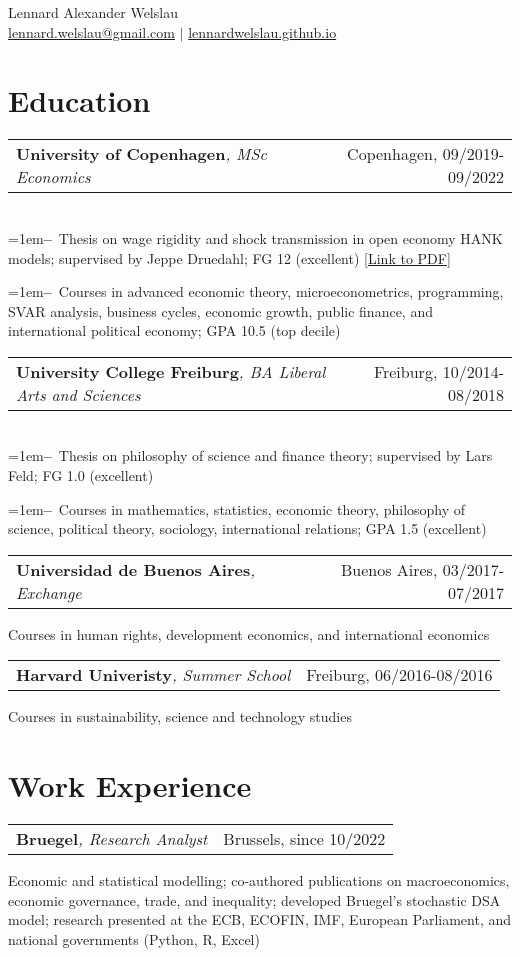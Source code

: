 \documentclass[A4,11pt]{article}
\makeatletter
\newcommand{\Subheading}[4]{   
    \begin{tabular*}{0.97\textwidth}[t]{l@{\extracolsep{\fill}}r}
      \textbf{#1}\textit{\small #2} & \footnotesize #3 
      \end{tabular*}
      \small #4 
    \vspace{7pt}}
\newcommand{\myitem}[1]{\hangindent=1em\hangafter=1\textbf{--}~#1\par}
\makeatother
\begin{document}
\begin{center}
    {\Large Lennard Alexander Welslau} \\ 
    \href{mailto:lennard.welslau@gmail.com}{lennard.welslau@gmail.com} $|$ \href{https://lennardwelslau.github.io/}{lennardwelslau.github.io}
\end{center}


\section{Education}

    \Subheading
        {University of Copenhagen}{, MSc Economics}{Copenhagen, 09/2019-09/2022}
        {\\
        \myitem{Thesis on wage rigidity and shock transmission in open economy HANK models; 
        supervised by Jeppe Druedahl; FG 12 (excellent) 
        [\href{https://lennardwelslau.github.io/research/Welslau_MA_Thesis_2022_Wage_Flexibility_Open_Economy_HANK.pdf}{Link to PDF}]}
        \myitem{Courses in advanced economic theory, microeconometrics, programming, 
        SVAR analysis, business cycles, economic growth, public finance, and 
        international political economy; GPA 10.5 (top decile)}
        } 

    \Subheading
        {University College Freiburg}{, BA Liberal Arts and Sciences}{Freiburg, 10/2014-08/2018}
        {\\
        \myitem{Thesis on philosophy of science and finance theory; 
        supervised by Lars Feld; FG 1.0 (excellent)}
        \myitem{Courses in mathematics, statistics, economic theory, 
        philosophy of science, political theory, sociology, international 
        relations; GPA 1.5 (excellent)}
        }

    \Subheading
        {Universidad de Buenos Aires}{, Exchange}{Buenos Aires, 03/2017-07/2017}
        {Courses in human rights, development economics, and international economics}
    
    \Subheading
        {Harvard Univeristy}{, Summer School}{Freiburg, 06/2016-08/2016}
        {Courses in sustainability, science and technology studies}

\section{Work Experience}

    \Subheading
        {Bruegel}{, Research Analyst}{Brussels, since 10/2022}
        {Economic and statistical modelling; co-authored publications on macroeconomics, 
        economic governance, trade, and inequality; developed Bruegel's stochastic DSA model;
        research presented at the ECB, ECOFIN, IMF, European Parliament, and national governments 
        (Python, R, Excel)}{}
\end{document}
